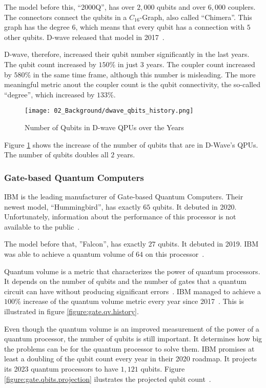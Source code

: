 The model before this, ``2000Q'', has over $2, 000$ qubits and over $6, 000$ couplers.
The connectors connect the qubits in a $C_{16}$-Graph, also called ``Chimera''.
This graph has the degree $6$, which means that every qubit has a connection with $5$ other qubits.
D-wave released that model in 2017~\cite{D-Wave2020, Zbinden2020}.

D-wave, therefore, increased their qubit number significantly in the last years.
The qubit count increased by $150\%$ in just $3$ years.
The coupler count increased by $580\%$ in the same time frame, although this number is misleading.
The more meaningful metric anout the coupler count is the qubit connectivity, the so-called ``degree'', which increased by $133\%$.

\begin{figure}[!ht]
  \centering
  \texttt{[image: 02\_Background/dwave\_qbits\_history.png]}
  \caption{Number of Qubits in D-wave QPUs over the Years \cite{D-Wave2018, D-Wave2020}}
  \label{figure:annealing.processors.history}
\end{figure}

Figure \ref{figure:annealing.processors.history} shows the increase of the number of qubits that are in D-Wave's QPUs.
The number of qubits doubles all $2$ years.

\subsubsection{Gate-based Quantum Computers}

IBM is the leading manufacturer of Gate-based Quantum Computers.
Their newest model, ``Hummingbird'', has exactly $65$ qubits.
It debuted in 2020.
Unfortunately, information about the performance of this processor is not available to the public~\cite{IBMRoadmap2020}.

The model before that, ''Falcon'', has exactly $27$ qubits.
It debuted in 2019.
IBM was able to achieve a quantum volume of $64$ on this processor~\cite{IBMRoadmap2020}.

Quantum volume is a metric that characterizes the power of quantum processors.
It depends on the number of qubits and the number of gates that a quantum circuit can have without producing significant errors~\cite{Bishop2017}.
IBM managed to achieve a $100\%$ increase of the quantum volume metric every year since 2017~\cite{IBMqv2020}.
This is illustrated in figure \ref{figure:gate.qv.history}.

Even though the quantum volume is an improved measurement of the power of a quantum processor, the number of qubits is still important.
It determines how big the problems can be for the quantum processor to solve them.
IBM promises at least a doubling of the qubit count every year in their 2020 roadmap.
It projects its 2023 quantum processors to have $1, 121$ qubits.
Figure \ref{figure:gate.qbits.projection} ilustrates the projected qubit count~\cite{IBMRoadmap2020}.

